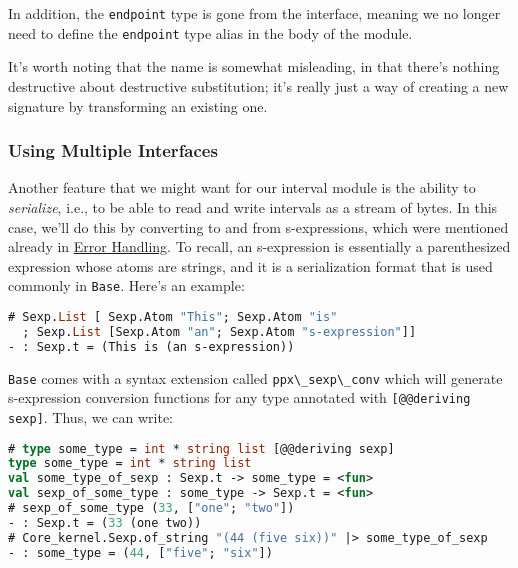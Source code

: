 In addition, the \passthrough{\lstinline!endpoint!} type is gone from
the interface, meaning we no longer need to define the
\passthrough{\lstinline!endpoint!} type alias in the body of the module.

It's worth noting that the name is somewhat misleading, in that there's
nothing destructive about destructive substitution; it's really just a
way of creating a new signature by transforming an existing one.

\hypertarget{using-multiple-interfaces}{%
\subsubsection{Using Multiple
Interfaces}\label{using-multiple-interfaces}}

Another feature that we might want for our interval module is the
ability to \emph{serialize}, i.e., to be able to read and write
intervals as a stream of bytes. In this case, we'll do this by
converting to and from s-expressions, which were mentioned already in
\href{error-handling.html\#error-handling}{Error Handling}. To recall,
an s-expression is essentially a parenthesized expression whose atoms
are strings, and it is a serialization format that is used commonly in
\passthrough{\lstinline!Base!}. Here's an example:

\begin{lstlisting}[language=Caml]
# Sexp.List [ Sexp.Atom "This"; Sexp.Atom "is"
  ; Sexp.List [Sexp.Atom "an"; Sexp.Atom "s-expression"]]
- : Sexp.t = (This is (an s-expression))
\end{lstlisting}

\passthrough{\lstinline!Base!} comes with a syntax extension called
\passthrough{\lstinline!ppx\_sexp\_conv!} which will generate
s-expression conversion functions for any type annotated with
\passthrough{\lstinline![@@deriving sexp]!}. Thus, we can write:

\begin{lstlisting}[language=Caml]
# type some_type = int * string list [@@deriving sexp]
type some_type = int * string list
val some_type_of_sexp : Sexp.t -> some_type = <fun>
val sexp_of_some_type : some_type -> Sexp.t = <fun>
# sexp_of_some_type (33, ["one"; "two"])
- : Sexp.t = (33 (one two))
# Core_kernel.Sexp.of_string "(44 (five six))" |> some_type_of_sexp
- : some_type = (44, ["five"; "six"])
\end{lstlisting}

